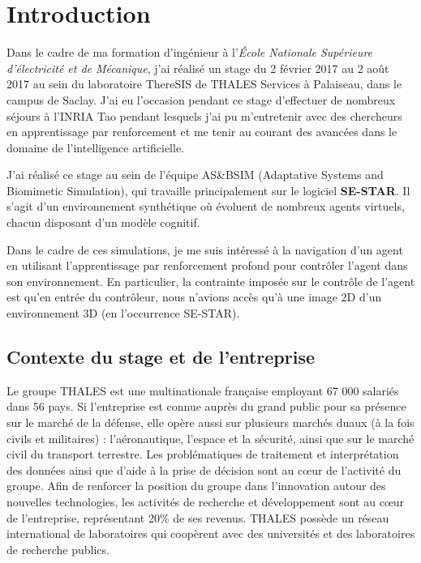 \section{Introduction}

Dans le cadre de ma formation d'ingénieur à l'\emph{École Nationale Supérieure d'électricité et de Mécanique}, j'ai réalisé un stage du 2 février 2017 au 2 août 2017 au sein du laboratoire ThereSIS de THALES Services à Palaiseau, dans le campus de Saclay. J'ai eu l'occasion pendant ce stage d'effectuer de nombreux séjours à l'INRIA Tao pendant lesquels j'ai pu m'entretenir avec des chercheurs en apprentissage par renforcement et me tenir au courant des avancées dans le domaine de l'intelligence artificielle.

J'ai réalisé ce stage au sein de l'équipe AS&BSIM (Adaptative Systems and
Biomimetic Simulation), qui travaille principalement sur le logiciel \textbf{SE-STAR}. Il s’agit d’un environnement synthétique où évoluent de nombreux agents virtuels, chacun disposant d’un modèle cognitif. 

Dans le cadre de ces simulations, je me suis intéressé à la navigation d'un agent en utilisant l'apprentissage par renforcement profond pour contrôler l'agent dans son environnement. En particulier, la contrainte imposée sur le contrôle de l'agent est qu'en entrée du contrôleur, nous n'avions accès qu'à une image 2D d'un environnement 3D (en l'occurrence SE-STAR).



\subsection{Contexte du stage et de l'entreprise}

Le groupe THALES est une multinationale française employant 67 000 salariés
dans 56 pays. Si l’entreprise est connue auprès du grand public pour sa présence
sur le marché de la défense, elle opère aussi sur plusieurs marchés duaux (à la
fois civils et militaires) : l’aéronautique, l’espace et la sécurité, ainsi que sur le
marché civil du transport terrestre. Les problématiques de traitement et
interprétation des données ainsi que d’aide à la prise de décision sont au cœur
de l’activité du groupe. Afin de renforcer la position du groupe dans l’innovation
autour des nouvelles technologies, les activités de recherche et développement
sont au cœur de l’entreprise, représentant 20\% de ses revenus. THALES possède
un réseau international de laboratoires qui coopèrent avec des universités et des
laboratoires de recherche publics.

